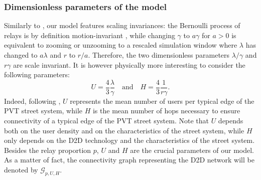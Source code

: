 \documentclass[conference]{IEEEtran}
\begin{document}
\subsubsection{Dimensionless parameters of the model}
Similarly to \cite{cali2018percolation}, our model features scaling invariances: the Bernoulli process of relays is by definition motion-invariant \cite[Section 14.1.3]{blaszczyszyn_stochastic_2018}, while changing $\gamma$ to $a\gamma$ for $a>0$ is equivalent to zooming or unzooming to a rescaled simulation window where $\lambda$ has changed to $a\lambda$ and $r$ to $r/a$. Therefore, the two dimensionless parameters $\lambda / \gamma$ and $r\gamma$ are scale invariant. It is however physically more interesting to consider the following parameters:
\begin{equation}
\label{dimensionless-parameters}
U = \frac{4}{3}\frac{\lambda}{\gamma} \quad \text{and} \quad H=\frac{4}{3}\frac{1}{r\gamma}.    
\end{equation}
Indeed, following \cite[Section 9.4]{chiu_stochastic_2013}, $U$ represents the mean number of users per typical edge of the PVT street system, while $H$ is the mean number of hops necessary to ensure connectivity of a typical edge of the PVT street system. Note that $U$ depends both on the user density and on the characteristics of the street system, while $H$ only depends on the D2D technology and the characteristics of the street system. 
Besides the relay proportion $p$, $U$ and $H$ are the crucial parameters of our model. As a matter of fact, the connectivity graph representing the D2D network will be denoted by $\mathcal{G}_{p,U,H}$.  
\end{document}
